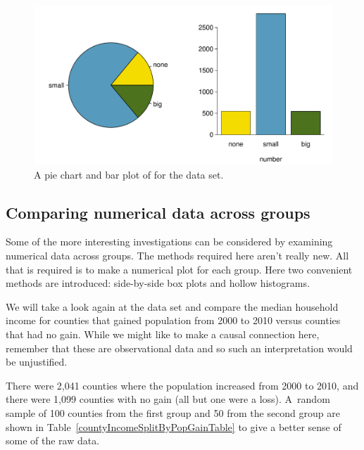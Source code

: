 \begin{figure}[h]
   \centering
   \includegraphics[width=\textwidth]{ch_intro_to_data/figures/emailNumberPieChart/emailNumberPieChart}
   \caption{A pie chart and bar plot of  for the  data set.}
   \label{emailNumberPieChart}
\end{figure}


\subsection{Comparing numerical data across groups}
\label{comparingAcrossGroups}


Some of the more interesting investigations can be considered by examining numerical data across groups. The methods required here aren't really new. All that is required is to make a numerical plot for each group. Here two convenient methods are introduced: side-by-side box plots and hollow histograms.

We will take a look again at the  data set and compare the median household income for counties that gained population from 2000 to 2010 versus counties that had no gain. While we might like to make a causal connection here, remember that these are observational data and so such an interpretation would be unjustified.

There were 2,041 counties where the population increased from 2000 to 2010, and there were 1,099 counties with no gain (all but one were a loss). A~random sample of 100 counties from the first group and 50 from the second group are shown in Table~\ref{countyIncomeSplitByPopGainTable} to give a better sense of some of the raw data.

